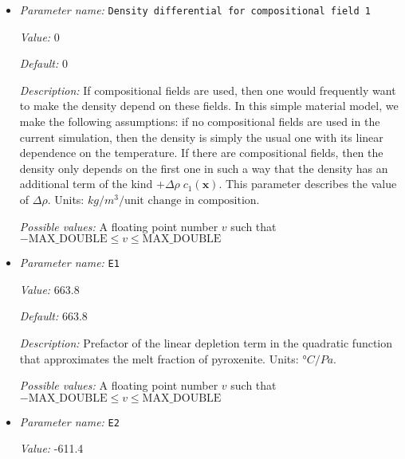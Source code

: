 \begin{itemize}
{\it Possible values:} A floating point number $v$ such that $-\text{MAX\_DOUBLE} \leq v \leq \text{MAX\_DOUBLE}$
\item {\it Parameter name:} {\tt Density differential for compositional field 1}
\label{parameters:Material model/Latent heat melt/Density differential for compositional field 1}
\label{parameters:Material_20model/Latent_20heat_20melt/Density_20differential_20for_20compositional_20field_201}


{\it Value:} 0


{\it Default:} 0


{\it Description:} If compositional fields are used, then one would frequently want to make the density depend on these fields. In this simple material model, we make the following assumptions: if no compositional fields are used in the current simulation, then the density is simply the usual one with its linear dependence on the temperature. If there are compositional fields, then the density only depends on the first one in such a way that the density has an additional term of the kind $+\Delta \rho \; c_1(\mathbf x)$. This parameter describes the value of $\Delta \rho$. Units: $kg/m^3/\textrm{unit change in composition}$.


{\it Possible values:} A floating point number $v$ such that $-\text{MAX\_DOUBLE} \leq v \leq \text{MAX\_DOUBLE}$
\item {\it Parameter name:} {\tt E1}
\label{parameters:Material model/Latent heat melt/E1}
\label{parameters:Material_20model/Latent_20heat_20melt/E1}


{\it Value:} 663.8


{\it Default:} 663.8


{\it Description:} Prefactor of the linear depletion term in the quadratic function that approximates the melt fraction of pyroxenite. Units: $°C/Pa$.


{\it Possible values:} A floating point number $v$ such that $-\text{MAX\_DOUBLE} \leq v \leq \text{MAX\_DOUBLE}$
\item {\it Parameter name:} {\tt E2}
\label{parameters:Material model/Latent heat melt/E2}
\label{parameters:Material_20model/Latent_20heat_20melt/E2}


{\it Value:} -611.4



\end{itemize}
